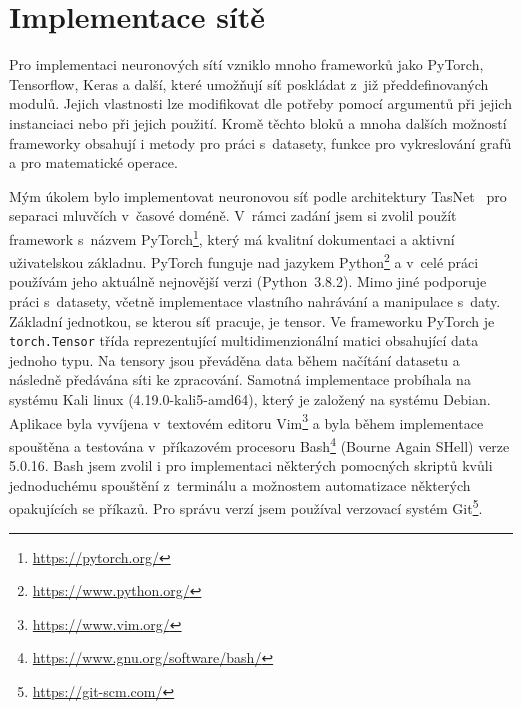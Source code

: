 


\chapter{Implementace sítě}
\label{implementace}
Pro implementaci neuronových sítí vzniklo mnoho frameworků jako PyTorch, Tensorflow, Keras a další, které umožňují síť poskládat z~již předdefinovaných modulů. Jejich vlastnosti lze modifikovat dle potřeby pomocí argumentů při jejich instanciaci nebo při jejich použití. Kromě těchto bloků a mnoha dalších možností frameworky obsahují i metody pro práci s~datasety, funkce pro vykreslování grafů a pro matematické operace.

Mým úkolem bylo implementovat neuronovou síť podle architektury TasNet~\cite{luo2018convtasnet} pro separaci mluvčích v~časové doméně. V~rámci zadání jsem si zvolil použít framework s~názvem PyTorch\footnote{\url{https://pytorch.org/}}, který má kvalitní dokumentaci a aktivní uživatelskou základnu. PyTorch funguje nad jazykem Python\footnote{\url{https://www.python.org/}} a v~celé práci používám jeho aktuálně nejnovější verzi (Python~3.8.2). Mimo jiné podporuje práci s~datasety, včetně implementace vlastního nahrávání a manipulace s~daty. Základní jednotkou, se kterou síť pracuje, je tensor. Ve frameworku PyTorch je \texttt{torch.Tensor} třída reprezentující multidimenzionální matici obsahující data jednoho typu. Na tensory jsou převáděna data během načítání datasetu a následně předávána síti ke zpracování. Samotná implementace probíhala na systému Kali linux (4.19.0-kali5-amd64), který je založený na systému Debian. Aplikace byla vyvíjena v~textovém editoru Vim\footnote{\url{https://www.vim.org/}} a byla během implementace spouštěna a testována v~příkazovém procesoru Bash\footnote{\url{https://www.gnu.org/software/bash/}} (Bourne Again SHell) verze 5.0.16. Bash jsem zvolil i pro implementaci některých pomocných skriptů kvůli jednoduchému spouštění z~terminálu a možnostem automatizace některých opakujících se příkazů. Pro správu verzí jsem používal verzovací systém Git\footnote{\url{https://git-scm.com/}}.

